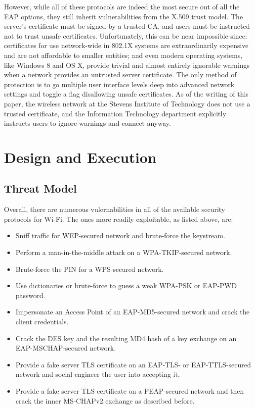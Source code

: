 \documentclass[journal, compsoc]{IEEEtran}
\begin{document}
However, while all of these protocols are indeed the most secure out
of all the EAP options, they still inherit vulnerabilities from the
X.509 trust model. The server's certificate must be signed by a
trusted CA, and users must be instructed not to trust unsafe
certificates.  Unfortunately, this can be near impossible since:
certificates for use network-wide in 802.1X systems are
extraordinarily expensive and are not affordable to smaller entities;
and even modern operating systems, like Windows 8 and OS X, provide
trivial and almost entirely ignorable warnings when a network provides
an untrusted server certificate.  The only method of protection is to
go multiple user interface levels deep into advanced network settings
and toggle a flag disallowing unsafe certificates.  As of the writing
of this paper, the wireless network at the Stevens Institute of
Technology does not use a trusted certificate, and the Information
Technology department explicitly instructs users to ignore warnings
and connect anyway.

\section{Design and Execution}
\label{sec:design}

\subsection{Threat Model}
\label{sec:design-model}

Overall, there are numerous vulernabilities in all of the available
security protocols for Wi-Fi. The ones more readily exploitable, as
listed above, are:

\begin{itemize}
\item Sniff traffic for WEP-secured network and brute-force the
  keystream.
\item Perform a man-in-the-middle attack on a WPA-TKIP-secured
  network.
\item Brute-force the PIN for a WPS-secured network.
\item Use dictionaries or brute-force to guess a weak WPA-PSK or
  EAP-PWD password.
\item Impersonate an Access Point of an EAP-MD5-secured network and
  crack the client credentials.
\item Crack the DES key and the resulting MD4 hash of a key exchange
  on an EAP-MSCHAP-secured network.
\item Provide a fake server TLS certificate on an EAP-TLS- or
  EAP-TTLS-secured network and social engineer the user into accepting
  it.
\item Provide a fake server TLS certificate on a PEAP-secured network
  and then crack the inner MS-CHAPv2 exchange as described before.
\end{itemize}
\end{document}
